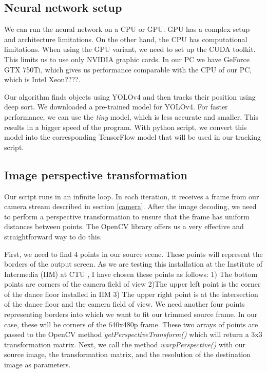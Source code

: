 \documentclass{ctuthesis}
\begin{document}
\subsection{Neural network setup}
We can run the neural network on a CPU or GPU. GPU has a complex setup and architecture limitations. On the other hand, the CPU has computational limitations. When using the GPU variant, we need to set up the CUDA toolkit. This limits us to use only NVIDIA graphic cards. In our PC we have GeForce GTX 750Ti, which gives us performance comparable with the CPU of our PC, which is Intel Xeon????. 

Our algorithm finds objects using YOLOv4 and then tracks their position using deep sort. We downloaded a pre-trained model for YOLOv4\cite{96}. For faster performance, we can use the \textit{tiny} model, which is less accurate and smaller. This results in a bigger speed of the program. With python script, we convert this model into the corresponding TensorFlow model that will be used in our tracking script.

\subsection{Image perspective transformation}
Our script runs in an infinite loop. In each iteration, it receives a frame from our camera stream described in section \ref{camera}. After the image decoding, we need to perform a perspective transformation to ensure that the frame has uniform distances between points. The OpenCV library offers us a very effective and straightforward way to do this. 

First, we need to find 4 points in our source scene. These points will represent the borders of the output screen. As we are testing this installation at the Institute of Intermedia (IIM) at CTU \cite{95}, I have chosen these points as follows: 1) The bottom points are corners of the camera field of view 2)The upper left point is the corner of the dance floor installed in IIM 3) The upper right point is at the intersection of the dance floor and the camera field of view. We need another four points representing borders into which we want to fit our trimmed source frame. In our case, these will be corners of the 640x480p frame. These two arrays of points are passed to the OpenCV method \textit{getPerspectiveTransform()} which will return a 3x3 transformation matrix. Next, we call the method \textit{warpPerspective()} with our source image, the transformation matrix, and the resolution of the destination image as parameters. 
\end{document}
